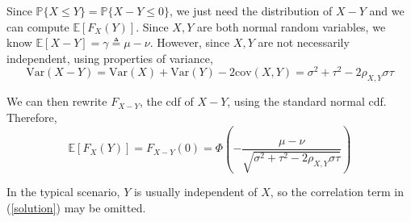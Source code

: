 \documentclass{article}
\numberwithin{equation}{section}
\begin{document}
Since $ \mathbb{P}\{X \le Y\} = \mathbb{P}\{X - Y \le 0\} $, we just need the
distribution of $ X - Y $ and we can compute $ \mathbb{E}[F_X(Y)] $. Since
$ X, Y $ are both normal random variables, we know
$ \mathbb{E}[X - Y] = \gamma \triangleq \mu - \nu $. However, since $ X, Y $ are
not necessarily independent, using properties of
variance\footnotemark{},
\begin{equation*}
    \mathrm{Var}(X - Y) = \mathrm{Var}(X) + \mathrm{Var}(Y) -
        2\mathrm{cov}(X, Y) =
    \sigma^2 + \tau^2 - 2\rho_{X, Y}\sigma\tau
\end{equation*}

We can then rewrite $ F_{X - Y} $, the cdf of $ X - Y $, using the standard
normal cdf. Therefore,
\begin{equation} \label{solution}
    \mathbb{E}[F_X(Y)] = F_{X - Y}(0) =
    \Phi\left(-\frac{\mu - \nu}{
        \sqrt{\sigma^2 + \tau^2 - 2\rho_{X, Y}\sigma\tau}
    }\right)
\end{equation}

In the typical scenario, $ Y $ is usually independent of $ X $, so the
correlation term in (\ref{solution}) may be omitted.
\end{document}
